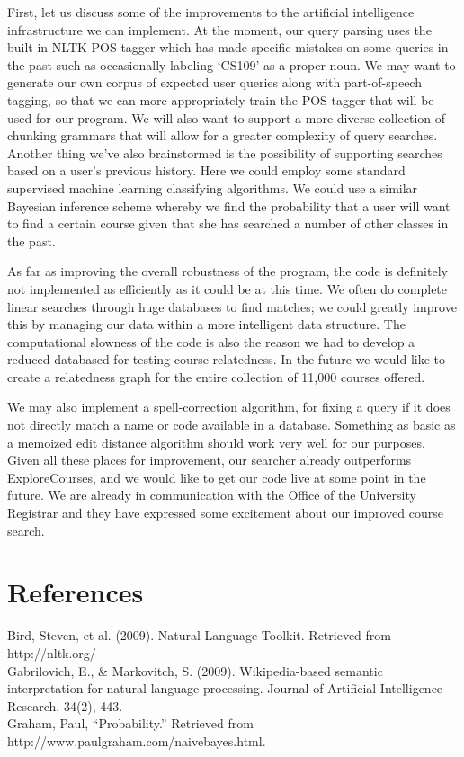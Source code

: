 \documentclass[12pt]{article}
\begin{document}
First, let us discuss some of the improvements to the artificial
intelligence infrastructure we can implement. At the moment, our query
parsing uses the built-in NLTK POS-tagger which has made specific
mistakes on some queries in the past such as occasionally labeling
`CS109' as a proper noun. We may want to generate our own corpus of
expected user queries along with part-of-speech tagging, so that we
can more appropriately train the POS-tagger that will be used for our
program. We will also want to support a more diverse collection of
chunking grammars that will allow for a greater complexity of query
searches. Another thing we've also brainstormed is the possibility of
supporting searches based on a user's previous history. Here we could
employ some standard supervised machine learning classifying
algorithms. We could use a similar Bayesian inference scheme whereby
we find the probability that a user will want to find a certain course
given that she has searched a number of other classes in the past.

As far as improving the overall robustness of the program, the code is
definitely not implemented as efficiently as it could be at this
time. We often do complete linear searches through huge databases to
find matches; we could greatly improve this by managing our data
within a more intelligent data structure. The computational slowness
of the code is also the reason we had to develop a reduced databased
for testing course-relatedness. In the future we would like to create
a relatedness graph for the entire collection of 11,000 courses
offered. 

We may also implement a spell-correction algorithm,
for fixing a query if it does not directly match a name or code
available in a database. Something as basic as a memoized edit
distance algorithm should work very well for our purposes. Given all
these places for improvement, our searcher already outperforms
ExploreCourses, and we would like to get our code live at some point
in the future. We are already in communication with the Office of the
University Registrar and they have expressed some excitement about our
improved course search.



\section*{References}

\indent Bird, Steven, et al. (2009). Natural Language Toolkit. Retrieved from http://nltk.org/\\

Gabrilovich, E., \& Markovitch, S. (2009). Wikipedia-based semantic interpretation for natural language processing. Journal of Artificial Intelligence Research, 34(2), 443.\\

Graham, Paul, ``Probability.'' Retrieved from http://www.paulgraham.com/naivebayes.html.
\end{document}
